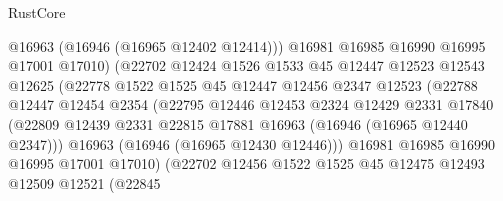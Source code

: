 \begin{lexlean}{RustCore}
\begin{coremodule}
                                  @16963
                                  (@16946 (@16965 @12402 @12414)))
                                @16981
                                @16985
                                @16990
                                @16995
                                @17001
                                @17010)
                              (@22702
                                @12424
                                @1526
                                @1533
                                @45
                                @12447
                                @12523
                                @12543
                                @12625
                                (@22778
                                  @1522
                                  @1525
                                  @45
                                  @12447
                                  @12456
                                  @2347
                                  @12523
                                  (@22788
                                    @12447
                                    @12454
                                    @2354
                                    (@22795
                                      @12446
                                      @12453
                                      @2324
                                      @12429
                                      @2331
                                      @17840
                                      (@22809
                                        @12439
                                        @2331
                                        @22815
                                        @17881
                                        @16963
                                        (@16946 (@16965 @12440 @2347)))
                                      @16963
                                      (@16946 (@16965 @12430 @12446)))
                                    @16981
                                    @16985
                                    @16990
                                    @16995
                                    @17001
                                    @17010)
                                  (@22702
                                    @12456
                                    @1522
                                    @1525
                                    @45
                                    @12475
                                    @12493
                                    @12509
                                    @12521
                                    (@22845

\end{coremodule}
\end{lexlean}
